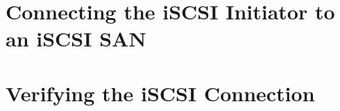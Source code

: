 
\usepackage{minted}
\usepackage{booktabs}


	
	
	\section{Connecting the iSCSI Initiator to an iSCSI SAN}
	\section{Verifying the iSCSI Connection}	
	




